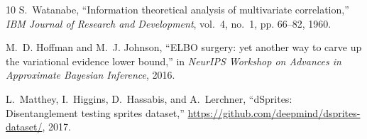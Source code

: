 \documentclass[10pt,journal,compsoc]{IEEEtran}
\begin{document}
\begin{thebibliography}{10}
S.~Watanabe, ``Information theoretical analysis of multivariate correlation,'' \emph{IBM Journal of Research and Development}, vol.~4, no.~1, pp. 66--82, 1960.

M.~D. Hoffman and M.~J. Johnson, ``{ELBO} surgery: yet another way to carve up the variational evidence lower bound,'' in \emph{NeurIPS Workshop on Advances in Approximate Bayesian Inference}, 2016.

L.~Matthey, I.~Higgins, D.~Hassabis, and A.~Lerchner, ``{dSprites}: Disentanglement testing sprites dataset,'' \url{https://github.com/deepmind/dsprites-dataset/}, 2017.

\end{thebibliography}
\end{document}
